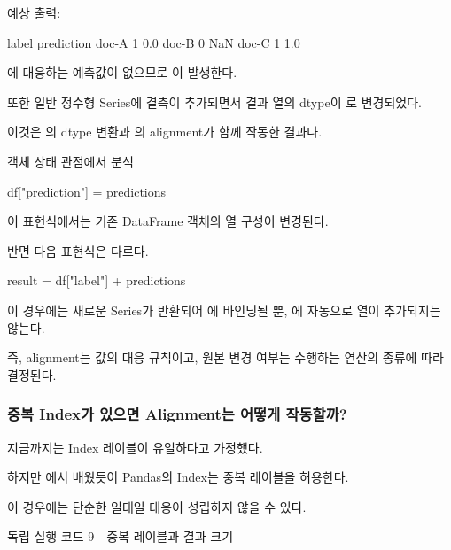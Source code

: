 예상 출력:

\begin{dhkzsh}
       label  prediction
doc-A      1         0.0
doc-B      0         NaN
doc-C      1         1.0
\end{dhkzsh}

에 대응하는 예측값이 없으므로 이 발생한다.

또한 일반 정수형 Series에 결측이 추가되면서 결과 열의 dtype이 로 변경되었다.

이것은 의 dtype 변환과 의 alignment가 함께 작동한 결과다.

\begin{dhknote}
\begin{dhksmry}[centered]
객체 상태 관점에서 분석
\end{dhksmry}
\end{dhknote}

\begin{dhkcode}
df["prediction"] = predictions
\end{dhkcode}

이 표현식에서는 기존 DataFrame 객체의 열 구성이 변경된다.

반면 다음 표현식은 다르다.

\begin{dhkcode}
result = df["label"] + predictions
\end{dhkcode}

이 경우에는 새로운 Series가 반환되어 에 바인딩될 뿐, 에 자동으로 열이 추가되지는 않는다.

즉, alignment는 값의 대응 규칙이고, 원본 변경 여부는 수행하는 연산의 종류에 따라 결정된다.

\subsubsection{중복 Index가 있으면 Alignment는 어떻게 작동할까?}

지금까지는 Index 레이블이 유일하다고 가정했다.

하지만 에서 배웠듯이 Pandas의 Index는 중복 레이블을 허용한다.

이 경우에는 단순한 일대일 대응이 성립하지 않을 수 있다.

\begin{dhknote}
\begin{dhksmry}[centered]
독립 실행 코드 9 - 중복 레이블과 결과 크기
\end{dhksmry}
\end{dhknote}

